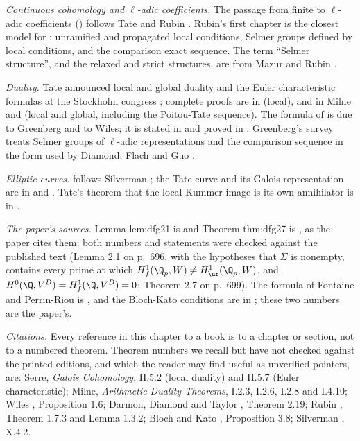 \emph{Continuous cohomology and $\ell$-adic coefficients.} The passage from finite to $\ell$-adic coefficients () follows Tate \cite[Section 2]{Tate95} and
Rubin \cite[Sections 1.1 to 1.3 and Appendix B]{Rubin}. Rubin's first chapter is the closest model for :
unramified and propagated local conditions, Selmer groups defined by local conditions, and the comparison exact sequence. The term ``Selmer structure'', and the
relaxed and strict structures, are from Mazur and Rubin \cite[Chapter 2]{MazurRubin04}.

\emph{Duality.} Tate announced local and global duality and the Euler characteristic formulas at the Stockholm congress \cite{TateDuality}; complete proofs are in
\cite[Chapter II, Section 5]{SerreGaloisCoh} (local), and in Milne \cite[Chapter I]{MilneADT} and \cite[Chapters VII and VIII]{NSW} (local and global, including the
Poitou-Tate sequence). The formula of  is due to Greenberg and to Wiles; it is stated in \cite[Section 1]{Wiles95} and proved in
\cite[Section 2]{DDT}. Greenberg's survey \cite{Greenberg89} treats Selmer groups of $\ell$-adic representations and the comparison sequence in the form used by Diamond,
Flach and Guo \cite[Section 2]{DFG04}.

\emph{Elliptic curves.}  follows Silverman \cite[Chapters VIII and X]{SilvermanAEC}; the Tate curve and its Galois representation are in
\cite[Chapter V]{SilvermanATAEC} and \cite[Chapter IV, Appendix]{SerreAbelian}. Tate's theorem that the local Kummer image is its own annihilator is in
\cite[Chapter I, Section 3]{MilneADT}.

\emph{The paper's sources.} Lemma lem:dfg21 is \cite[Lemma 2.1]{DFG04} and Theorem thm:dfg27 is \cite[Theorem 2.7]{DFG04}, as the paper cites them; both numbers and statements
were checked against the published text (Lemma 2.1 on p.~696, with the hypotheses that $\Sigma$ is nonempty, contains every prime at which $H^1_f(\Q_p,W)\ne H^1_{\ur}(\Q_p,W)$, and
$H^0(\Q,V^D)=H^1_f(\Q,V^D)=0$; Theorem 2.7 on p.~699). The formula of Fontaine and Perrin-Riou is \cite[I.4.2.2]{FPR94}, and the Bloch-Kato conditions are in \cite[Section 3]{BlochKato};
these two numbers are the paper's.

\emph{Citations.} Every reference in this chapter to a book is to a chapter or section, not to a numbered theorem. Theorem numbers we recall but have not checked
against the printed editions, and which the reader may find useful as unverified pointers, are: Serre, \emph{Galois Cohomology}, II.5.2 (local duality) and II.5.7
(Euler characteristic); Milne, \emph{Arithmetic Duality Theorems}, I.2.3, I.2.6, I.2.8 and I.4.10; Wiles \cite{Wiles95}, Proposition 1.6; Darmon, Diamond and Taylor
\cite{DDT}, Theorem 2.19; Rubin \cite{Rubin}, Theorem 1.7.3 and Lemma 1.3.2; Bloch and Kato \cite{BlochKato}, Proposition 3.8; Silverman \cite{SilvermanAEC}, X.4.2.

